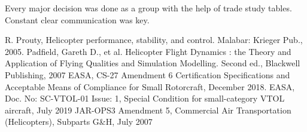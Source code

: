 \documentclass[11pt,a4paper]{article}
\begin{document}
Every major decision was done as a group with the help of trade study tables. Constant clear communication was key.
\begin{thebibliography}{}
R. Prouty, Helicopter performance, stability, and control. Malabar: Krieger Pub., 2005.
 Padfield, Gareth D., et al. Helicopter Flight Dynamics : the Theory and Application of Flying Qualities and
Simulation Modelling. Second ed., Blackwell Publishing, 2007
 EASA, CS-27 Amendment 6 Certification Specifications and Acceptable Means of Compliance for Small Rotorcraft, December 2018.
EASA, Doc. No: SC-VTOL-01 Issue: 1, Special Condition for small-category VTOL aircraft, July 2019
 JAR-OPS3 Amendment 5, Commercial Air Transportation (Helicopters), Subparts G&H, July 2007
\end{thebibliography}{}
\newpage
\end{document}

